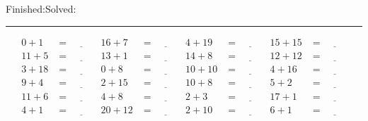 \documentclass{article}
\begin{document}
\begin{sloppy}
\begin{center}
{\selectfont {Started:}\underline{\hspace{1.5cm}}{Finished:}\underline{\hspace{1.5cm}}{Solved:}\underline{\hspace{1.5cm}}}
\end{center}
\hrule
\begin{align*}
    {0} + {1} &= \underline{\hspace{1cm}} & {16} + {7} &= \underline{\hspace{1cm}} & {4} + {19} &= \underline{\hspace{1cm}} & {15} + {15} &= \underline{\hspace{1cm}} \\
    {11} + {5} &= \underline{\hspace{1cm}} & {13} + {1} &= \underline{\hspace{1cm}} & {14} + {8} &= \underline{\hspace{1cm}} & {12} + {12} &= \underline{\hspace{1cm}} \\
    {3} + {18} &= \underline{\hspace{1cm}} & {0} + {8} &= \underline{\hspace{1cm}} & {10} + {10} &= \underline{\hspace{1cm}} & {4} + {16} &= \underline{\hspace{1cm}} \\
    {9} + {4} &= \underline{\hspace{1cm}} & {2} + {15} &= \underline{\hspace{1cm}} & {10} + {8} &= \underline{\hspace{1cm}} & {5} + {2} &= \underline{\hspace{1cm}} \\
    {11} + {6} &= \underline{\hspace{1cm}} & {4} + {8} &= \underline{\hspace{1cm}} & {2} + {3} &= \underline{\hspace{1cm}} & {17} + {1} &= \underline{\hspace{1cm}} \\
    {4} + {1} &= \underline{\hspace{1cm}} & {20} + {12} &= \underline{\hspace{1cm}} & {2} + {10} &= \underline{\hspace{1cm}} & {6} + {1} &= \underline{\hspace{1cm}} \\

\end{align*}
\end{sloppy}
\end{document}
